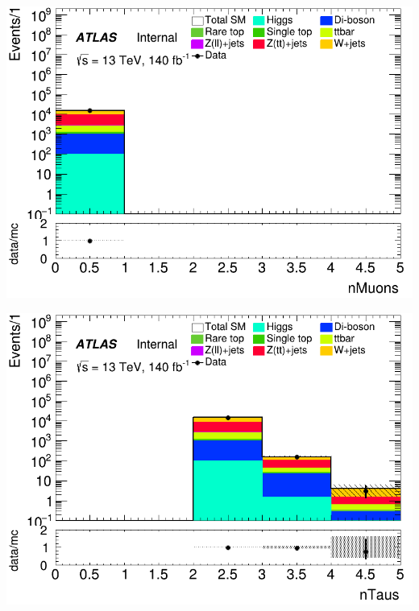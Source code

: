 \documentclass[usenames,dvipsnames]{beamer}
\begin{document}
\begin{frame}
    \begin{minipage}{0.32\textwidth}
        \centering
        \includegraphics[width=\textwidth]{graphics/HH_met/HH_met_nMuons.png}
    \end{minipage}
    \hfill
    \begin{minipage}{0.32\textwidth}
        \centering
        \includegraphics[width=\textwidth]{graphics/HH_met/HH_met_nTaus.png}
    \end{minipage}
    \hfill
    \begin{minipage}{0.32\textwidth}
        \centering

\end{minipage}
\end{frame}
\end{document}

